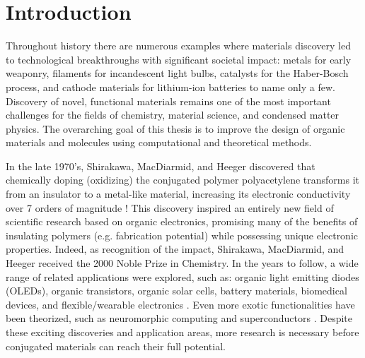 \chapter{Introduction}

Throughout history there are numerous examples where materials discovery led to technological breakthroughs with significant societal impact: metals for early weaponry, filaments for incandescent light bulbs, catalysts for the Haber-Bosch process, and cathode materials for lithium-ion batteries to name only a few. Discovery of novel, functional materials remains one of the most important challenges for the fields of chemistry, material science, and condensed matter physics. The overarching goal of this thesis is to improve the design of organic materials and molecules using computational and theoretical methods.

In the late 1970’s, Shirakawa, MacDiarmid, and Heeger discovered that chemically doping (oxidizing) the conjugated polymer polyacetylene transforms it from an insulator to a metal-like material, increasing its electronic conductivity over 7 orders of magnitude \cite{Shirakawa1977}! This discovery inspired an entirely new field of scientific research based on organic electronics, promising many of the benefits of insulating polymers (e.g. fabrication potential) while possessing unique electronic properties. Indeed, as recognition of the impact, Shirakawa, MacDiarmid, and Heeger received the 2000 Noble Prize in Chemistry. In the years to follow, a wide range of related applications were explored, such as: organic light emitting diodes (OLEDs), organic transistors, organic solar cells, battery materials, biomedical devices, and flexible/wearable electronics \cite{Burroughes1990, Sarpeshkar2002, Gunes2007, Liang2012, SmelaE.2003, Oh2016}. Even more exotic functionalities have been theorized, such as neuromorphic computing and superconductors \cite{VanDeBurgt2018, Swager2017}. Despite these exciting discoveries and application areas, more research is necessary before conjugated materials can reach their full potential.

